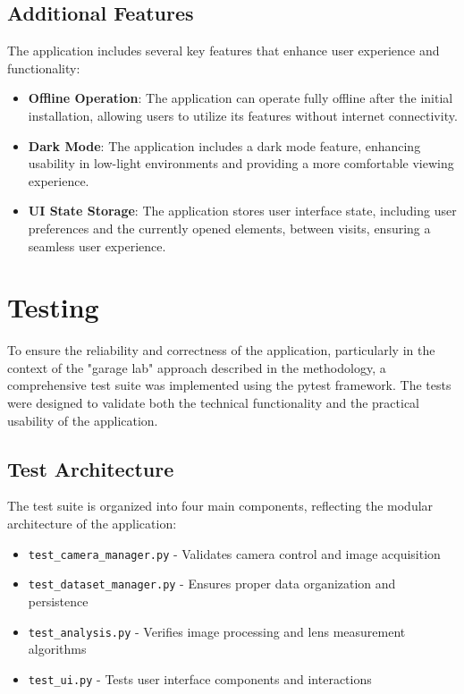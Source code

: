 \subsection{Additional Features}
The application includes several key features that enhance user experience and functionality:
\begin{itemize}
    \item \textbf{Offline Operation}: The application can operate fully offline after the initial installation, allowing users to utilize its features without internet connectivity.
    \item \textbf{Dark Mode}: The application includes a dark mode feature, enhancing usability in low-light environments and providing a more comfortable viewing experience.
    \item \textbf{UI State Storage}: The application stores user interface state, including user preferences and the currently opened elements, between visits, ensuring a seamless user experience.
\end{itemize}

\section{Testing}

To ensure the reliability and correctness of the application, particularly in the context of the "garage lab" approach described in the methodology, a comprehensive test suite was implemented using the pytest framework. The tests were designed to validate both the technical functionality and the practical usability of the application.

\subsection{Test Architecture}
The test suite is organized into four main components, reflecting the modular architecture of the application:
\begin{itemize}
    \item \texttt{test\_camera\_manager.py} - Validates camera control and image acquisition
    \item \texttt{test\_dataset\_manager.py} - Ensures proper data organization and persistence
    \item \texttt{test\_analysis.py} - Verifies image processing and lens measurement algorithms
    \item \texttt{test\_ui.py} - Tests user interface components and interactions
\end{itemize}

